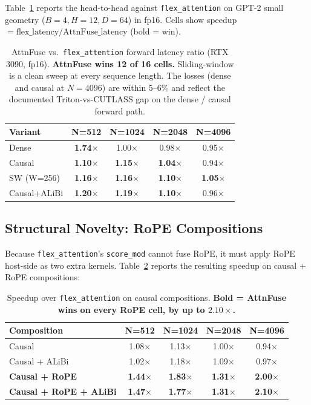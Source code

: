 \documentclass[10pt,twocolumn]{article}
\begin{document}
Table~\ref{tab:flex_headtohead} reports the head-to-head against
\texttt{flex\_attention} on GPT-2 small geometry ($B{=}4, H{=}12, D{=}64$)
in fp16. Cells show speedup $=
\text{flex\_latency} / \text{AttnFuse\_latency}$ (bold = win).

\begin{table}[H]
\centering\small
\begin{tabular}{lcccc}
\toprule
\textbf{Variant} & \textbf{N=512} & \textbf{N=1024} & \textbf{N=2048} & \textbf{N=4096} \\
\midrule
Dense        & \textbf{1.74$\times$} & 1.00$\times$ & 0.98$\times$ & 0.95$\times$ \\
Causal       & \textbf{1.10$\times$} & \textbf{1.15$\times$} & \textbf{1.04$\times$} & 0.94$\times$ \\
SW (W=256)   & \textbf{1.16$\times$} & \textbf{1.16$\times$} & \textbf{1.10$\times$} & \textbf{1.05$\times$} \\
Causal+ALiBi & \textbf{1.20$\times$} & \textbf{1.19$\times$} & \textbf{1.10$\times$} & 0.96$\times$ \\
\bottomrule
\end{tabular}
\caption{AttnFuse vs.\ \texttt{flex\_attention} forward latency
ratio (RTX 3090, fp16). \textbf{AttnFuse wins 12 of 16 cells.}
Sliding-window is a clean sweep at every sequence length. The losses
(dense and causal at $N{=}4096$) are within 5--6\% and reflect the
documented Triton-vs-CUTLASS gap on the dense / causal forward path.}
\label{tab:flex_headtohead}
\end{table}

\subsection{Structural Novelty: RoPE Compositions}
\label{sec:eval_rope}

Because \texttt{flex\_attention}'s \texttt{score\_mod} cannot fuse RoPE,
it must apply RoPE host-side as two extra kernels. Table~\ref{tab:rope_comp}
reports the resulting speedup on causal + RoPE compositions:

\begin{table}[H]
\centering\small
\begin{tabular}{lcccc}
\toprule
\textbf{Composition} & \textbf{N=512} & \textbf{N=1024} & \textbf{N=2048} & \textbf{N=4096} \\
\midrule
Causal               & 1.08$\times$ & 1.13$\times$ & 1.00$\times$ & 0.94$\times$ \\
Causal + ALiBi       & 1.02$\times$ & 1.18$\times$ & 1.09$\times$ & 0.97$\times$ \\
\textbf{Causal + RoPE}            & \textbf{1.44$\times$} & \textbf{1.83$\times$} & \textbf{1.31$\times$} & \textbf{2.00$\times$} \\
\textbf{Causal + RoPE + ALiBi}    & \textbf{1.47$\times$} & \textbf{1.77$\times$} & \textbf{1.31$\times$} & \textbf{2.10$\times$} \\
\bottomrule
\end{tabular}
\caption{Speedup over \texttt{flex\_attention} on causal compositions.
\textbf{Bold = AttnFuse wins on every RoPE cell, by up to $2.10\times$.}}
\label{tab:rope_comp}
\end{table}
\end{document}
